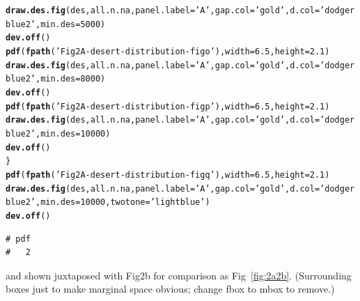 \documentclass{article}\usepackage[]{graphicx}\usepackage[]{color}
\makeatletter
\newcommand{\hlnum}[1]{\textcolor[rgb]{0.686,0.059,0.569}{#1}}%
\newcommand{\hlstr}[1]{\textcolor[rgb]{0.192,0.494,0.8}{#1}}%
\newcommand{\hlstd}[1]{\textcolor[rgb]{0.345,0.345,0.345}{#1}}%
\newcommand{\hlkwc}[1]{\textcolor[rgb]{0.333,0.667,0.333}{#1}}%
\newcommand{\hlkwd}[1]{\textcolor[rgb]{0.737,0.353,0.396}{\textbf{#1}}}%
\newenvironment{kframe}{%
 \def\at@end@of@kframe{}%
 \ifinner\ifhmode%
  \def\at@end@of@kframe{\end{minipage}}%
  \begin{minipage}{\columnwidth}%
 \fi\fi%
 \def\FrameCommand##1{\hskip\@totalleftmargin \hskip-\fboxsep
 \colorbox{shadecolor}{##1}\hskip-\fboxsep
     \hskip-\linewidth \hskip-\@totalleftmargin \hskip\columnwidth}%
 \MakeFramed {\advance\hsize-\width
   \@totalleftmargin\z@ \linewidth\hsize
   \@setminipage}}%
 {\par\unskip\endMakeFramed%
 \at@end@of@kframe}
\newenvironment{knitrout}{}{} %
\makeatother
\begin{document}
\begin{knitrout}
\begin{kframe}
\begin{alltt}
  \hlkwd{draw.des.fig}\hlstd{(des, all.n.na,} \hlkwc{panel.label}\hlstd{=}\hlstr{'A'}\hlstd{,}\hlkwc{gap.col} \hlstd{=} \hlstr{'gold'}\hlstd{,}\hlkwc{d.col}\hlstd{=}\hlstr{'dodgerblue2'}\hlstd{,}\hlkwc{min.des}\hlstd{=}\hlnum{5000}\hlstd{)}
  \hlkwd{dev.off}\hlstd{()}
  \hlkwd{pdf}\hlstd{(}\hlkwd{fpath}\hlstd{(}\hlstr{'Fig2A-desert-distribution-figo'}\hlstd{),} \hlkwc{width}\hlstd{=}\hlnum{6.5}\hlstd{,} \hlkwc{height}\hlstd{=}\hlnum{2.1}\hlstd{)}
  \hlkwd{draw.des.fig}\hlstd{(des, all.n.na,} \hlkwc{panel.label}\hlstd{=}\hlstr{'A'}\hlstd{,}\hlkwc{gap.col} \hlstd{=} \hlstr{'gold'}\hlstd{,}\hlkwc{d.col}\hlstd{=}\hlstr{'dodgerblue2'}\hlstd{,}\hlkwc{min.des}\hlstd{=}\hlnum{8000}\hlstd{)}
  \hlkwd{dev.off}\hlstd{()}
  \hlkwd{pdf}\hlstd{(}\hlkwd{fpath}\hlstd{(}\hlstr{'Fig2A-desert-distribution-figp'}\hlstd{),} \hlkwc{width}\hlstd{=}\hlnum{6.5}\hlstd{,} \hlkwc{height}\hlstd{=}\hlnum{2.1}\hlstd{)}
  \hlkwd{draw.des.fig}\hlstd{(des, all.n.na,} \hlkwc{panel.label}\hlstd{=}\hlstr{'A'}\hlstd{,}\hlkwc{gap.col} \hlstd{=} \hlstr{'gold'}\hlstd{,}\hlkwc{d.col}\hlstd{=}\hlstr{'dodgerblue2'}\hlstd{,}\hlkwc{min.des}\hlstd{=}\hlnum{10000}\hlstd{)}
  \hlkwd{dev.off}\hlstd{()}
\hlstd{\}}
\hlkwd{pdf}\hlstd{(}\hlkwd{fpath}\hlstd{(}\hlstr{'Fig2A-desert-distribution-figq'}\hlstd{),} \hlkwc{width}\hlstd{=}\hlnum{6.5}\hlstd{,} \hlkwc{height}\hlstd{=}\hlnum{2.1}\hlstd{)}
\hlkwd{draw.des.fig}\hlstd{(des, all.n.na,} \hlkwc{panel.label}\hlstd{=}\hlstr{'A'}\hlstd{,}\hlkwc{gap.col} \hlstd{=} \hlstr{'gold'}\hlstd{,}\hlkwc{d.col}\hlstd{=}\hlstr{'dodgerblue2'}\hlstd{,}\hlkwc{min.des}\hlstd{=}\hlnum{10000}\hlstd{,}\hlkwc{twotone}\hlstd{=}\hlstr{'lightblue'}\hlstd{)}
\hlkwd{dev.off}\hlstd{()}
\end{alltt}
\begin{verbatim}
# pdf 
#   2
\end{verbatim}
\end{kframe}
\end{knitrout}
\noindent and shown juxtaposed with Fig2b for comparison as Fig~\ref{fig:2a2b}.  (Surrounding boxes just to make marginal space obvious; change fbox to mbox to remove.)
\end{document}
